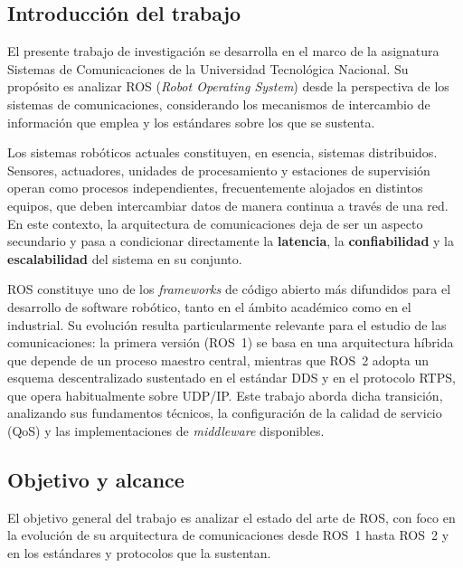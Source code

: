 \subsection{Introducción del trabajo}

El presente trabajo de investigación se desarrolla en el marco de la asignatura
Sistemas de Comunicaciones de la Universidad Tecnológica Nacional. Su propósito
es analizar ROS (\textit{Robot Operating System}) desde la perspectiva de los
sistemas de comunicaciones, considerando los mecanismos de intercambio de
información que emplea y los estándares sobre los que se sustenta.

Los sistemas robóticos actuales constituyen, en esencia, sistemas distribuidos.
Sensores, actuadores, unidades de procesamiento y estaciones de supervisión
operan como procesos independientes, frecuentemente alojados en distintos
equipos, que deben intercambiar datos de manera continua a través de una red.
En este contexto, la arquitectura de comunicaciones deja de ser un aspecto
secundario y pasa a condicionar directamente la \textbf{latencia}, la \textbf{confiabilidad} y la
\textbf{escalabilidad} del sistema en su conjunto.

ROS constituye uno de los \textit{frameworks} de código abierto más difundidos
para el desarrollo de software robótico, tanto en el ámbito académico como en
el industrial. Su evolución resulta particularmente relevante para el estudio de
las comunicaciones: la primera versión (ROS~1) se basa en una arquitectura
híbrida que depende de un proceso maestro central, mientras que ROS~2 adopta un
esquema descentralizado sustentado en el estándar DDS y en el protocolo RTPS,
que opera habitualmente sobre UDP/IP. Este trabajo aborda dicha transición, analizando
sus fundamentos técnicos, la configuración de la calidad de servicio (QoS) y
las implementaciones de \textit{middleware} disponibles.

\subsection{Objetivo y alcance}

El objetivo general del trabajo es analizar el estado del arte de ROS, con foco
en la evolución de su arquitectura de comunicaciones desde ROS~1 hasta ROS~2 y
en los estándares y protocolos que la sustentan.

